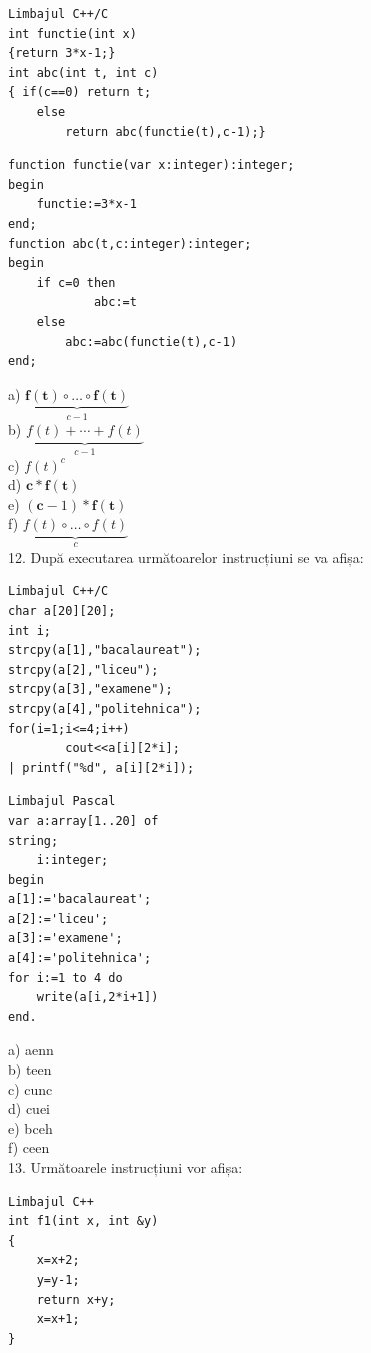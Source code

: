 \documentclass[10pt]{article}
\begin{document}
\begin{verbatim}
Limbajul C++/C
int functie(int x)
{return 3*x-1;}
int abc(int t, int c)
{ if(c==0) return t;
    else
        return abc(functie(t),c-1);}
\end{verbatim}



\begin{verbatim}
function functie(var x:integer):integer;
begin
    functie:=3*x-1
end;
function abc(t,c:integer):integer;
begin
    if c=0 then
            abc:=t
    else
        abc:=abc(functie(t),c-1)
end;
\end{verbatim}

a) $\underbrace{\boldsymbol{f}(\boldsymbol{t}) \circ \ldots \circ \boldsymbol{f}(\boldsymbol{t})}_{c-1}$\\
b) $\underbrace{f(t)+\cdots+f(t)}_{c-1}$\\
c) $f(t)^{c}$\\
d) $\boldsymbol{c} * \boldsymbol{f}(\boldsymbol{t})$\\
e) $(\boldsymbol{c}-1) * \boldsymbol{f}(\boldsymbol{t})$\\
f) $\underbrace{f(t) \circ \ldots \circ f(t)}_{c}$\\
12. După executarea următoarelor instrucțiuni se va afișa:

\begin{verbatim}
Limbajul C++/C
char a[20][20];
int i;
strcpy(a[1],"bacalaureat");
strcpy(a[2],"liceu");
strcpy(a[3],"examene");
strcpy(a[4],"politehnica");
for(i=1;i<=4;i++)
        cout<<a[i][2*i];
| printf("%d", a[i][2*i]);
\end{verbatim}

\begin{verbatim}
Limbajul Pascal
var a:array[1..20] of
string;
    i:integer;
begin
a[1]:='bacalaureat';
a[2]:='liceu';
a[3]:='examene';
a[4]:='politehnica';
for i:=1 to 4 do
    write(a[i,2*i+1])
end.
\end{verbatim}

a) aenn\\
b) teen\\
c) cunc\\
d) cuei\\
e) bceh\\
f) ceen\\
13. Următoarele instrucțiuni vor afișa:

\begin{verbatim}
Limbajul C++
int f1(int x, int &y)
{
    x=x+2;
    y=y-1;
    return x+y;
    x=x+1;
}
\end{verbatim}
\end{document}
